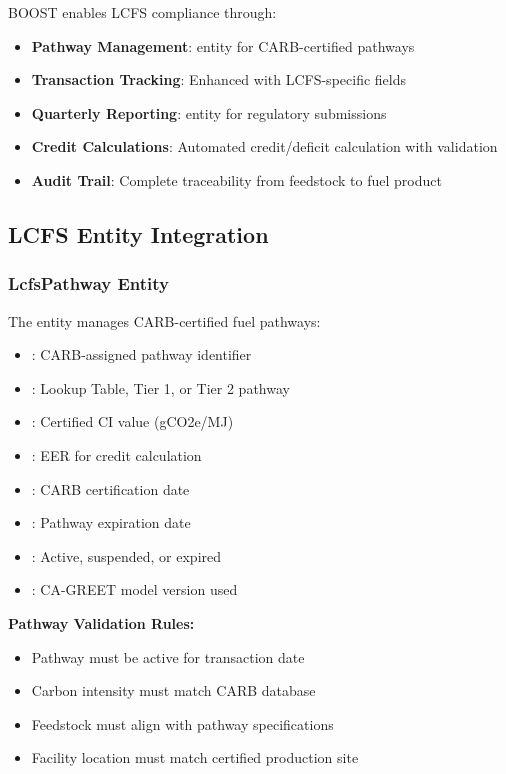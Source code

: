 BOOST enables LCFS compliance through:
\begin{itemize}
    \item \textbf{Pathway Management}:  entity for CARB-certified pathways
    \item \textbf{Transaction Tracking}: Enhanced  with LCFS-specific fields
    \item \textbf{Quarterly Reporting}:  entity for regulatory submissions
    \item \textbf{Credit Calculations}: Automated credit/deficit calculation with validation
    \item \textbf{Audit Trail}: Complete traceability from feedstock to fuel product
\end{itemize}

\subsection{LCFS Entity Integration}
\label{sec:lcfs-entities}

\subsubsection{LcfsPathway Entity}

The  entity manages CARB-certified fuel pathways:

\begin{itemize}
    \item {}: CARB-assigned pathway identifier
    \item {}: Lookup Table, Tier 1, or Tier 2 pathway
    \item {}: Certified CI value (gCO2e/MJ)
    \item {}: EER for credit calculation
    \item {}: CARB certification date
    \item {}: Pathway expiration date
    \item {}: Active, suspended, or expired
    \item {}: CA-GREET model version used
\end{itemize}

\textbf{Pathway Validation Rules:}
\begin{itemize}
    \item Pathway must be active for transaction date
    \item Carbon intensity must match CARB database
    \item Feedstock must align with pathway specifications
    \item Facility location must match certified production site
\end{itemize}

